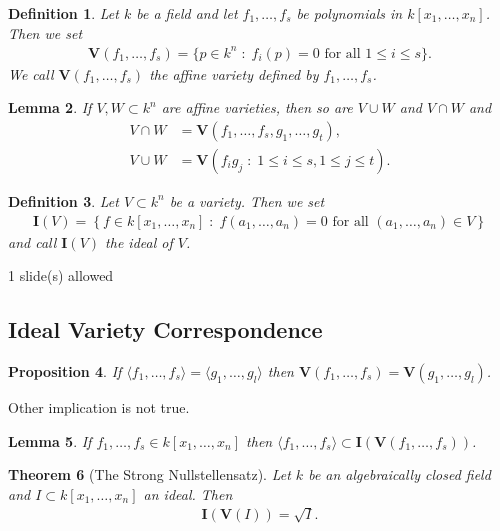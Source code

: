 \documentclass[11pt,a4paper,english]{scrartcl}
\newtheorem{defn}{Definition}
\newtheorem{thm}[defn]{Theorem}
\newtheorem{lem}[defn]{Lemma}
\newtheorem{prop}[defn]{Proposition}
\newcommand{\V}{\mathbf{V}}
\newcommand{\I}{\mathbf{I}}
\newcommand{\mvar}[2]{#1_1,\ldots , #1_{#2}}
\newcommand{\kxn}{k[\mvar{x}{n}]}
\newcommand{\fs}{\mvar{f}{s}}
\newcommand{\needSlides}[1]{\newpage \begin{needSl}#1 slide(s) allowed\end{needSl}}
\begin{document}
\begin{defn} Let $k$ be a field and let $f_1, \ldots, f_s$ be polynomials in $k[x_1,\ldots,x_n]$. Then we set 
\begin{align*}
\V (\mvar{f}{s})  = \{ p \in k^n \; :\; f_i(p) = 0 \text{ for all } 1\leq i \leq s \} .
\end{align*}
We call $\V(\mvar{f}{s})$ the \emph{affine variety} defined by $\mvar{f}{s}$.
\end{defn}


\begin{lem}
If $V,W \subset k^n$ are affine varieties, then so are $V\cup W$ and $V\cap W$ and
\begin{align*}
V\cap W &= \V (\mvar{f}{s},\mvar{g}{t}),\\
V\cup W &= \V (f_i g_j \; : \; 1\leq i \leq s, 1\leq j\leq t).
\end{align*}
\end{lem}

\begin{defn}
Let $V\subset k^n$ be a variety. Then we set 
\begin{align*}
\I (V) = \left\lbrace f\in \kxn \; :\; f(\mvar{a}{n}) =0 \text{ for all } (\mvar{a}{n}) \in V  \right\rbrace
\end{align*}
and  call $\I (V)$ \emph{the ideal of $V$}.
\end{defn}

\needSlides{1}
\subsection{Ideal Variety Correspondence}
\begin{prop}
If $\langle \mvar{f}{s} \rangle = \langle \mvar{g}{l} \rangle$ then $ \V (\fs  ) = \V (\mvar{g}{l})$.
\end{prop}
Other implication is not true.
\begin{lem}
\label{varidealssubset}
If $\mvar{f}{s} \in \kxn$ then $\langle \mvar{f}{s} \rangle \subset \I(\V(\mvar{f}{s}))$.
\end{lem}

\begin{thm}[The Strong Nullstellensatz]
Let $k$ be an algebraically closed field and $I \subset \kxn$ an ideal. Then 
\begin{align*}
\I(\V(I))=\sqrt{I} .
\end{align*}
\end{thm}
\end{document}

